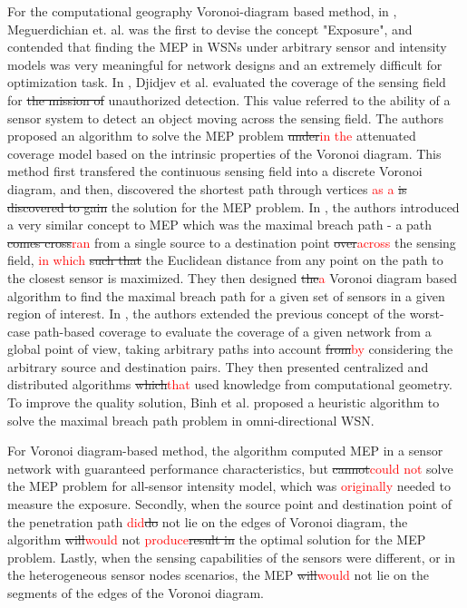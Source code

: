\documentclass[final]{elsarticle}
\begin{document}
For the computational geography Voronoi-diagram based method, in \cite{meguerdichian2001exposure}, Meguerdichian et. al. was the first to devise the concept "Exposure", and contended that finding the MEP in WSNs under arbitrary sensor and intensity models was very meaningful for network designs and an extremely difficult for optimization task. In \cite{djidjev2010approximation}, Djidjev et al. evaluated the coverage of the sensing field for \sout{the mission of} unauthorized detection. This value referred to the ability of a sensor system to detect an object moving across the sensing field. The authors proposed an algorithm to solve the MEP problem \sout{under}\textcolor{red}{in the} attenuated coverage model based on the intrinsic properties of the Voronoi diagram. This method first transfered the continuous sensing field into a discrete Voronoi diagram, and then, discovered the shortest path through vertices \textcolor{red}{as a} \sout{is discovered to gain} the solution for the MEP problem. In \cite{megerian2005worst}, the authors introduced a very similar concept to MEP which was the maximal breach path - a path \sout{comes cross}\textcolor{red}{ran} from a single source to a destination point \sout{over}\textcolor{red}{across} the sensing field, \textcolor{red}{in which} \sout{such that} the Euclidean distance from any point on the path to the closest sensor is maximized. They then designed \sout{the}\textcolor{red}{a} Voronoi diagram based algorithm to find the maximal breach path for a given set of sensors in a given region of interest. In \cite{lee2013best}, the authors  extended the previous concept of the worst-case path-based coverage to evaluate the coverage of a given network from a global point of view, taking arbitrary paths into account \sout{from}\textcolor{red}{by} considering the arbitrary source and destination pairs. They then presented centralized and distributed algorithms \sout{which}\textcolor{red}{that} used knowledge from computational geometry. To improve the quality solution, Binh et al. \cite{binh2016heuristic} proposed a heuristic algorithm to solve the maximal breach path problem in omni-directional WSN.

For Voronoi diagram-based method, the algorithm computed MEP in a sensor network with guaranteed performance characteristics, but \sout{cannot}\textcolor{red}{could not} solve the MEP problem for all-sensor intensity model, which was \textcolor{red}{originally} needed to measure the exposure. Secondly, when the source point and destination point of the penetration
path \textcolor{red}{did}\sout{do} not lie on the edges of Voronoi diagram, the algorithm \sout{will}\textcolor{red}{would} not \textcolor{red}{produce}\sout{result in} the optimal solution for the MEP problem. Lastly, when the sensing capabilities of the sensors were different, or in the heterogeneous sensor nodes scenarios, the MEP \sout{will}\textcolor{red}{would} not lie on the segments of the edges of the Voronoi diagram.
\end{document}
